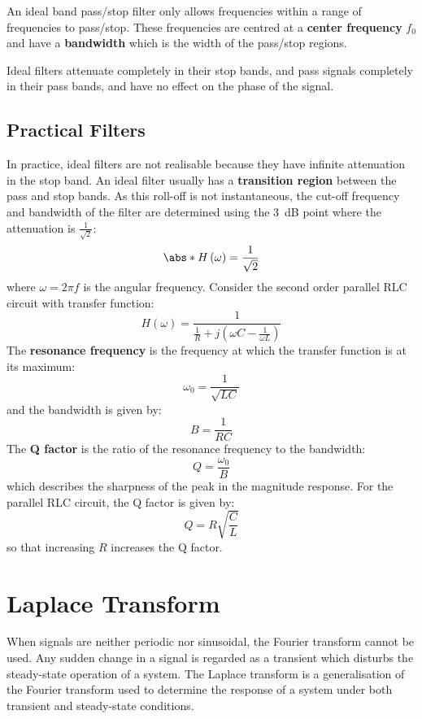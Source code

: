 \documentclass{article}
\begin{document}
An ideal band pass/stop filter only allows frequencies within a range of frequencies to pass/stop.
These frequencies are centred at a \textbf{center frequency} \(f_0\) and have a \textbf{bandwidth} which is the width of the pass/stop regions.

Ideal filters attenuate completely in their stop bands, and pass signals completely in their pass bands,
and have no effect on the phase of the signal.
\subsection{Practical Filters}
In practice, ideal filters are not realisable because they have infinite attenuation in the stop band.
An ideal filter usually has a \textbf{transition region} between the pass and stop bands.
As this roll-off is not instantaneous, the cut-off frequency and bandwidth of the filter are determined using the \qty{3}{dB} point where
the attenuation is \(\frac{1}{\sqrt{2}}\):
\begin{equation*}
    \abs*{H\left( \omega \right)} = \frac{1}{\sqrt{2}}
\end{equation*}
where \(\omega = 2\pi f\) is the angular frequency.
Consider the second order parallel RLC circuit with transfer function:
\begin{equation*}
    H\left( \omega \right) = \frac{1}{\frac{1}{R} + j \left( \omega C - \frac{1}{\omega L} \right)}
\end{equation*}
The \textbf{resonance frequency} is the frequency at which the transfer function is at its maximum:
\begin{equation*}
    \omega_0 = \frac{1}{\sqrt{LC}}
\end{equation*}
and the bandwidth is given by:
\begin{equation*}
    B = \frac{1}{RC}
\end{equation*}
The \textbf{Q factor} is the ratio of the resonance frequency to the bandwidth:
\begin{equation*}
    Q = \frac{\omega_0}{B}
\end{equation*}
which describes the sharpness of the peak in the magnitude response.
For the parallel RLC circuit, the Q factor is given by:
\begin{equation*}
    Q = R \sqrt{\frac{C}{L}}
\end{equation*}
so that increasing \(R\) increases the Q factor.
\section{Laplace Transform}
When signals are neither periodic nor sinusoidal, the Fourier transform cannot be used.
Any sudden change in a signal is regarded as a transient which disturbs the steady-state operation of a system.
The Laplace transform is a generalisation of the Fourier transform used to determine the response of a system under both
transient and steady-state conditions.
\end{document}
